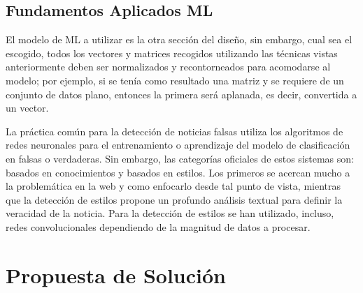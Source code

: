 \documentclass{llncs}
\begin{document}
\begin{multicols}{2}[]
\subsection{Fundamentos Aplicados ML}

El modelo de ML a utilizar es la otra secci\'on del dise\~no, sin embargo, cual sea el escogido, todos los vectores y matrices recogidos utilizando las t\'ecnicas vistas anteriormente deben
ser normalizados y recontorneados para acomodarse al modelo; por ejemplo, si se ten\'ia como resultado una matriz y se requiere de un conjunto de datos plano, entonces la primera ser\'a
aplanada, es decir, convertida a un vector.

La pr\'actica com\'un para la detecci\'on de noticias falsas utiliza los algoritmos de redes neuronales para el entrenamiento o aprendizaje del modelo de clasificaci\'on en falsas o verdaderas.
Sin embargo, las categor\'ias oficiales de estos sistemas son: basados en conocimientos y basados en estilos. Los primeros se acercan mucho a la problem\'atica en la web y como enfocarlo
desde tal punto de vista, mientras que la detecci\'on de estilos propone un profundo an\'alisis textual para definir la veracidad de la noticia. Para la detecci\'on de estilos se han utilizado,
incluso, redes convolucionales dependiendo de la magnitud de datos a procesar.

\section{Propuesta de Soluci\'on}
\end{multicols}



\end{document}
